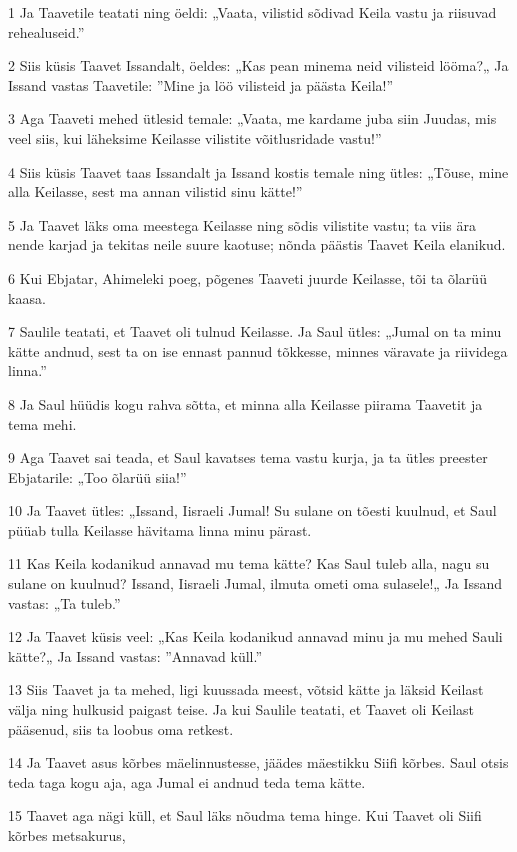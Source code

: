 \par 1 Ja Taavetile teatati ning öeldi: „Vaata, vilistid sõdivad Keila vastu ja riisuvad rehealuseid.”
\par 2 Siis küsis Taavet Issandalt, öeldes: „Kas pean minema neid vilisteid lööma?„ Ja Issand vastas Taavetile: ”Mine ja löö vilisteid ja päästa Keila!”
\par 3 Aga Taaveti mehed ütlesid temale: „Vaata, me kardame juba siin Juudas, mis veel siis, kui läheksime Keilasse vilistite võitlusridade vastu!”
\par 4 Siis küsis Taavet taas Issandalt ja Issand kostis temale ning ütles: „Tõuse, mine alla Keilasse, sest ma annan vilistid sinu kätte!”
\par 5 Ja Taavet läks oma meestega Keilasse ning sõdis vilistite vastu; ta viis ära nende karjad ja tekitas neile suure kaotuse; nõnda päästis Taavet Keila elanikud.
\par 6 Kui Ebjatar, Ahimeleki poeg, põgenes Taaveti juurde Keilasse, tõi ta õlarüü kaasa.
\par 7 Saulile teatati, et Taavet oli tulnud Keilasse. Ja Saul ütles: „Jumal on ta minu kätte andnud, sest ta on ise ennast pannud tõkkesse, minnes väravate ja riividega linna.”
\par 8 Ja Saul hüüdis kogu rahva sõtta, et minna alla Keilasse piirama Taavetit ja tema mehi.
\par 9 Aga Taavet sai teada, et Saul kavatses tema vastu kurja, ja ta ütles preester Ebjatarile: „Too õlarüü siia!”
\par 10 Ja Taavet ütles: „Issand, Iisraeli Jumal! Su sulane on tõesti kuulnud, et Saul püüab tulla Keilasse hävitama linna minu pärast.
\par 11 Kas Keila kodanikud annavad mu tema kätte? Kas Saul tuleb alla, nagu su sulane on kuulnud? Issand, Iisraeli Jumal, ilmuta ometi oma sulasele!„ Ja Issand vastas: „Ta tuleb.”
\par 12 Ja Taavet küsis veel: „Kas Keila kodanikud annavad minu ja mu mehed Sauli kätte?„ Ja Issand vastas: ”Annavad küll.”
\par 13 Siis Taavet ja ta mehed, ligi kuussada meest, võtsid kätte ja läksid Keilast välja ning hulkusid paigast teise. Ja kui Saulile teatati, et Taavet oli Keilast pääsenud, siis ta loobus oma retkest.
\par 14 Ja Taavet asus kõrbes mäelinnustesse, jäädes mäestikku Siifi kõrbes. Saul otsis teda taga kogu aja, aga Jumal ei andnud teda tema kätte.
\par 15 Taavet aga nägi küll, et Saul läks nõudma tema hinge. Kui Taavet oli Siifi kõrbes metsakurus,

